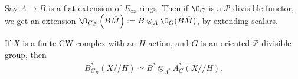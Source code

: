Say $A \to B$ is a flat extension of $E_\infty$ rings. Then if $\O_G$ is a $\mathcal{P}$-divisible functor, we get an extension $\O_{G_B} \left( B\v{M} \right):= B \otimes_A \O_G(B\v{M})$, by extending scalars.

\begin{theorem} If $X$ is a finite CW complex with an $H$-action, and $G$ is an oriented $\mathcal{P}$-divisible group, then
\begin{align*}
    B_{G_B}^\ast \left( X // H \right) \simeq B^\ast \otimes_{A^\ast} A_G^\ast \left( X // H \right).
\end{align*}
\end{theorem}

